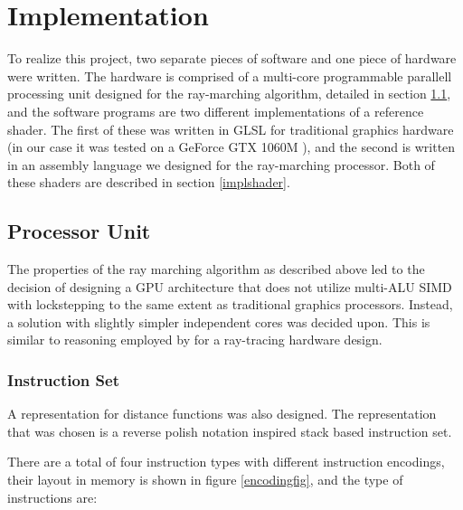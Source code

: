 \chapter{Implementation}
	
	To realize this project, two separate pieces of software and one piece of
	hardware were written. The hardware is comprised of a multi-core
	programmable parallell processing unit designed for the ray-marching
	algorithm, detailed in section \ref{implproc}, and the software programs
	are two different implementations of a reference shader.  The first of
	these was written in GLSL for traditional graphics hardware (in our case 
	it was tested on a GeForce GTX 1060M ), and the second is written in an 
	assembly language we designed for the ray-marching processor. Both of 
	these shaders are described in section \ref{implshader}.
	
	\section{Processor Unit} \label{implproc}

		The properties of the ray marching algorithm as described above led to
		the decision of designing a GPU architecture that does not utilize
		multi-ALU SIMD with lockstepping to the same extent as traditional
		graphics processors. Instead, a solution with slightly simpler
		independent cores was decided upon. This is similar to reasoning
		employed by \cite{Woop2005} for a ray-tracing hardware design.
	
		\subsection{Instruction Set}

			A representation for distance functions was also designed. The
			representation that was chosen is a reverse polish notation
			inspired stack based instruction set.
	
			There are a total of four instruction types with different
			instruction encodings, their layout in memory is shown in figure
			\ref{encodingfig}, and the type of instructions are:

